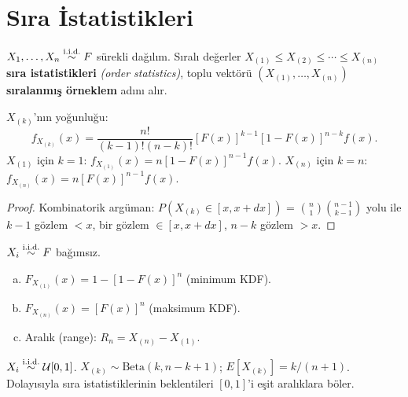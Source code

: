 \section{Sıra İstatistikleri}
\label{sec:sira_istatistik}

\begin{tanim}\label{def:sira_ist}
$X_1,\ldots,X_n\overset{\text{i.i.d.}}{\sim} F$ sürekli dağılım. Sıralı değerler $X_{(1)}\leq X_{(2)}\leq\cdots\leq X_{(n)}$ \textbf{sıra istatistikleri} \emph{(order statistics)}, toplu vektörü $(X_{(1)},\ldots,X_{(n)})$ \textbf{sıralanmış örneklem} adını alır.
\end{tanim}

\begin{teorem}\label{thm:sira_yogunluk}
$X_{(k)}$'nın yoğunluğu:
\[
  f_{X_{(k)}}(x) = \frac{n!}{(k-1)!(n-k)!}[F(x)]^{k-1}[1-F(x)]^{n-k}f(x).
\]
$X_{(1)}$ için $k=1$: $f_{X_{(1)}}(x) = n[1-F(x)]^{n-1}f(x)$.
$X_{(n)}$ için $k=n$: $f_{X_{(n)}}(x) = n[F(x)]^{n-1}f(x)$.
\end{teorem}

\begin{proof}
Kombinatorik argüman: $P(X_{(k)}\in[x,x+dx])$ = $\binom{n}{1}\binom{n-1}{k-1}$ yolu ile $k-1$ gözlem $<x$, bir gözlem $\in[x,x+dx]$, $n-k$ gözlem $>x$.
\end{proof}

\begin{teorem}\label{thm:min_max}
$X_i\overset{\text{i.i.d.}}{\sim} F$ bağımsız.
\begin{enumerate}[(a)]
  \item $F_{X_{(1)}}(x) = 1-[1-F(x)]^n$ (minimum KDF).
  \item $F_{X_{(n)}}(x) = [F(x)]^n$ (maksimum KDF).
  \item Aralık (range): $R_n=X_{(n)}-X_{(1)}$.
\end{enumerate}
\end{teorem}

\begin{ornek}\label{ex:uniform_sira}
$X_i\overset{\text{i.i.d.}}{\sim}\mathcal{U}[0,1]$. $X_{(k)}\sim\mathrm{Beta}(k,n-k+1)$; $E[X_{(k)}]=k/(n+1)$. Dolayısıyla sıra istatistiklerinin beklentileri $[0,1]$'i eşit aralıklara böler.
\end{ornek}

